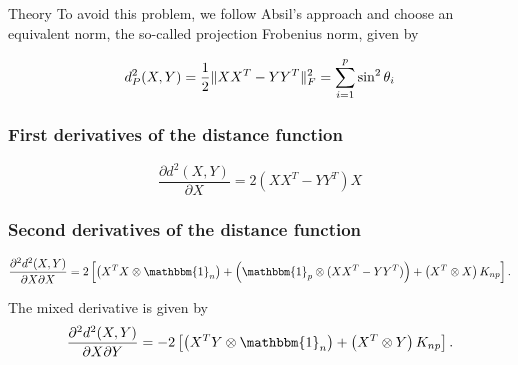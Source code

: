 \begin{chapter}{Theory}
To avoid this problem, we follow Absil's \cite{AbsilGrassmann} approach and choose an equivalent norm, the so-called projection Frobenius norm, given by

\begin{equation}
    d_P^2(X,Y) = \frac{1}{2}\| XX^T-YY^T \|_{F}^{2} = \sum_{i=1}^p\sin^2\theta_i
\end{equation}




\subsubsection{First derivatives of the distance function} %
\label{ssub:First derivatives of the distance function}

\begin{equation}
    \label{eq:gr_x_der}
    \frac{\partial d^2(X,Y)}{\partial X} = 2\left(XX^T-YY^T\right)X
\end{equation}



\subsubsection{Second derivatives of the distance function} %
\label{ssub:Second derivatives of the distance function}

\begin{equation}
    \label{eq:gr_xx_der}
    \frac{\partial^2 d^2(X,Y)}{\partial X\partial X} = 2
    \left[
	\left(X^TX\otimes \mathbbm{1}_{n}\right) 
	+ \left(\mathbbm{1}_p\otimes (XX^T-YY^T)\right)
	+ \left(X^T\otimes X\right)K_{np}
    \right].
\end{equation}

The mixed derivative is given by
\begin{equation}
    \label{eq:gr_xy_der}
    \frac{\partial^2 d^2(X,Y)}{\partial X\partial Y} = -2\left[\left(X^TY\otimes \mathbbm{1}_{n}\right) + \left(X^T\otimes Y\right)K_{np}\right].
\end{equation}







\end{chapter}
